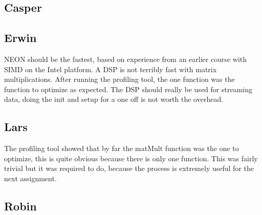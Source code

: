 \documentclass[final]{article} %
\begin{document}
\begin{appendices}
\subsection{Casper}

\subsection{Erwin}
NEON should be the fastest, based on experience from an earlier course with SIMD on the Intel platform.
A DSP is not terribly fast with matrix multiplications.
After running the profiling tool, the one function was the function to optimize as expected.
The DSP should really be used for streaming data, doing the init and setup for a one off is not worth the overhead.

\subsection{Lars}
The profiling tool showed that by far the matMult function was the one to optimize, this is quite obvious because there is only one function.
This was fairly trivial but it was required to do, because the process is extremely useful for the next assignment.

\subsection{Robin}

\end{appendices}
\end{document}
